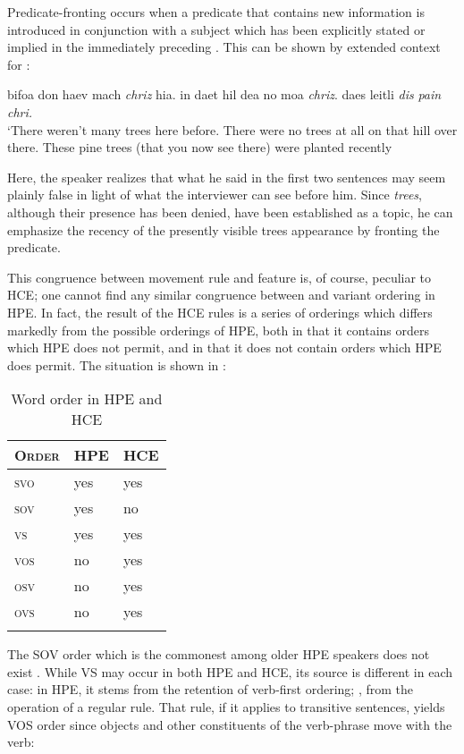 Predicate-fronting occurs when a predicate that contains new information is introduced in conjunction with a subject which has been explicitly stated or implied in the immediately preceding . This can be shown by extended context for :

\ea\label{ex:26}
 bifoa don haev mach \textit{chriz} hia. in daet hil dea no moa \textit{chriz}. daes leitli \textit{dis} \textit{pain} \textit{chri.} \\
\glt  `There weren't many trees here before. There were no trees
at all on that hill over there. These pine trees (that you now see there) were planted recently
\z

\noindent Here, the speaker realizes that what he said in the first two sentences may seem plainly false in light of what the interviewer can see before him. Since \textit{trees}, although their presence has been denied, have been established as a topic, he can emphasize the recency of the presently visible trees appearance by fronting the predicate.

This congruence between movement rule and  feature is, of course, peculiar to HCE; one cannot find any similar congruence between  and variant ordering in HPE. In fact, the result of the HCE rules is a series of orderings which differs markedly from the possible orderings of HPE, both in that it contains orders which HPE does not permit, and in that it does not contain orders which HPE does permit. The situation is shown in :


\begin{table}
\begin{tabular}{>{\scshape}lll}
\lsptoprule
\rm Order & HPE & HCE\\
\midrule
svo  & yes &  yes\\
sov  & yes  &  no\\
vs  & yes  & yes\\
vos  & no & yes\\
osv  & no &  yes\\
ovs  & no &  yes\\
\lspbottomrule
\end{tabular}
\caption{Word order in HPE and HCE}
\label{tab:1.1}
\end{table}

The SOV order which is the commonest among older  HPE speakers does not exist . While VS may occur in both HPE and HCE, its source is different in each case: in HPE, it stems from the retention of verb-first ordering; , from the operation of a regular rule. That rule, if it applies to transitive sentences, yields VOS order  since objects and other constituents of the verb-phrase move
with the verb:

